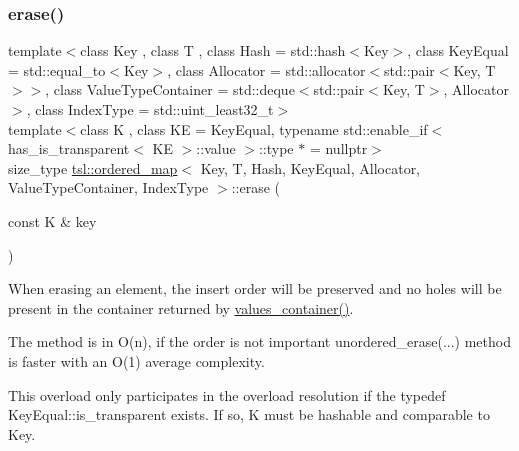 \subsubsection{\texorpdfstring{erase()}{erase()}\hspace{0.1cm}{\footnotesize\ttfamily [6/7]}}
{\footnotesize\ttfamily template$<$class Key , class T , class Hash  = std\+::hash$<$\+Key$>$, class Key\+Equal  = std\+::equal\+\_\+to$<$\+Key$>$, class Allocator  = std\+::allocator$<$std\+::pair$<$\+Key, T$>$$>$, class Value\+Type\+Container  = std\+::deque$<$std\+::pair$<$\+Key, T$>$, Allocator$>$, class Index\+Type  = std\+::uint\+\_\+least32\+\_\+t$>$ \\
template$<$class K , class KE  = Key\+Equal, typename std\+::enable\+\_\+if$<$ has\+\_\+is\+\_\+transparent$<$ K\+E $>$\+::value $>$\+::type $\ast$  = nullptr$>$ \\
size\+\_\+type \mbox{\hyperlink{classtsl_1_1ordered__map}{tsl\+::ordered\+\_\+map}}$<$ Key, T, Hash, Key\+Equal, Allocator, Value\+Type\+Container, Index\+Type $>$\+::erase (\begin{DoxyParamCaption}\item[{const K \&}]{key }\end{DoxyParamCaption})\hspace{0.3cm}{\ttfamily [inline]}}





When erasing an element, the insert order will be preserved and no holes will be present in the container returned by \textquotesingle{}\mbox{\hyperlink{classtsl_1_1ordered__map_abb69bca0a80def48ae806078d77175cb}{values\+\_\+container()}}\textquotesingle{}.

The method is in O(n), if the order is not important \textquotesingle{}unordered\+\_\+erase(...)\textquotesingle{} method is faster with an O(1) average complexity.

This overload only participates in the overload resolution if the typedef Key\+Equal\+::is\+\_\+transparent exists. If so, K must be hashable and comparable to Key. \mbox{\label{classtsl_1_1ordered__map_a11b416d92cc924f0ad6c07b308914543}} 
